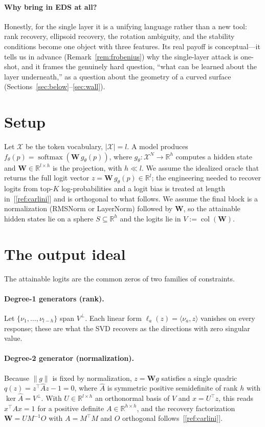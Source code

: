 \documentclass[11pt]{article}
\DeclareMathOperator{\col}{col}
\DeclareMathOperator{\softmax}{softmax}
\newcommand{\R}{\mathbb{R}}
\newcommand{\W}{\mathbf{W}}
\newcommand{\hidden}{g}
\newcommand{\Ahat}{\hat{A}}
\begin{document}
\paragraph{Why bring in EDS at all?} Honestly, for the single layer it is a
unifying language rather than a new tool: rank recovery, ellipsoid recovery, the
rotation ambiguity, and the stability conditions become one object with three
features. Its real payoff is conceptual---it tells us in advance
(Remark~\ref{rem:frobenius}) why the single-layer attack is one-shot, and it
frames the genuinely hard question, ``what can be learned about the layer
underneath,'' as a question about the geometry of a curved surface
(Sections~\ref{sec:below}--\ref{sec:wall}).

\section{Setup}\label{sec:setup}

Let $\mathcal{X}$ be the token vocabulary, $|\mathcal{X}|=l$. A model produces
$f_\theta(p)=\softmax(\W\,\hidden_\theta(p))$, where $\hidden_\theta\colon
\mathcal{X}^N\to\R^h$ computes a hidden state and $\W\in\R^{l\times h}$ is the
projection, with $h\ll l$. We assume the idealized oracle that returns the full
logit vector $z=\W\,\hidden_\theta(p)\in\R^l$; the engineering needed to recover
logits from top-$K$ log-probabilities and a logit bias is treated at length
in~[\ref{ref:carlini}] and is orthogonal to what follows. We assume the final
block is a normalization (RMSNorm or LayerNorm) followed by $\W$, so the
attainable hidden states lie on a sphere $S\subseteq\R^h$ and the logits lie in
$V:=\col(\W)$.

\section{The output ideal}\label{sec:ideal}

The attainable logits are the common zeros of two families of constraints.

\paragraph{Degree-1 generators (rank).} Let $\{\nu_1,\dots,\nu_{l-h}\}$ span
$V^\perp$. Each linear form $\ell_a(z)=\langle\nu_a,z\rangle$ vanishes on every
response; these are what the SVD recovers as the directions with zero singular
value.

\paragraph{Degree-2 generator (normalization).} Because $\|\hidden\|$ is fixed
by normalization, $z=\W\hidden$ satisfies a single quadric $q(z)=z^\top\Ahat
z-1=0$, where $\Ahat$ is symmetric positive semidefinite of rank $h$ with
$\ker\Ahat=V^\perp$. With $U\in\R^{l\times h}$ an orthonormal basis of $V$ and
$x=U^\top z$, this reads $x^\top A x=1$ for a positive definite $A\in\R^{h\times
h}$, and the recovery factorization $\W=U M^{-1}O$ with $A=M^\top M$ and $O$
orthogonal follows~[\ref{ref:carlini}].
\end{document}
